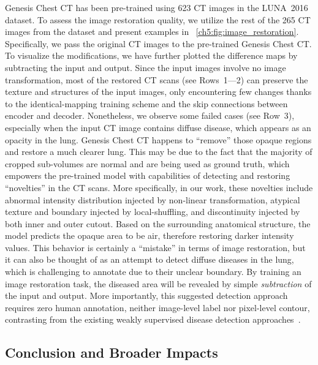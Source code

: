 Genesis Chest CT has been pre-trained using 623 CT images in the LUNA~2016 dataset. To assess the image restoration quality, we utilize the rest of the 265 CT images from the dataset and present examples in \figurename~\ref{ch5:fig:image_restoration}. Specifically, we pass the original CT images to the pre-trained Genesis Chest CT. To visualize the modifications, we have further plotted the difference maps by subtracting the input and output. Since the input images involve no image transformation, most of the restored CT scans (see Rows~1---2) can preserve the texture and structures of the input images, only encountering few changes thanks to the identical-mapping training scheme and the skip connections between encoder and decoder. Nonetheless, we observe some failed cases (see Row~3), especially when the input CT image contains diffuse disease, which appears as an opacity in the lung.
Genesis Chest CT happens to ``remove'' those opaque regions and restore a much clearer lung. This may be due to the fact that the majority of cropped sub-volumes are normal and are being used as ground truth, which empowers the pre-trained model with capabilities of detecting and restoring ``novelties'' in the CT scans. More specifically, in our work, these novelties include abnormal intensity distribution injected by non-linear transformation, atypical texture and boundary injected by local-shuffling, and discontinuity injected by both inner and outer cutout. Based on the surrounding anatomical structure, the model predicts the opaque area to be air, therefore restoring darker intensity values. This behavior is certainly a ``mistake'' in terms of image restoration, but it can also be thought of as an attempt to detect diffuse diseases in the lung, which is challenging to annotate due to their unclear boundary. By training an image restoration task, the diseased area will be revealed by simple \textit{subtraction} of the input and output. More importantly, this suggested detection approach requires zero human annotation, neither image-level label nor pixel-level contour, contrasting from the existing weakly supervised disease detection approaches~\citep{zhou2016learning,baumgartner2018visual,cai2018iterative,siddiquee2019learning}.


\subsection{Conclusion and Broader Impacts}
\label{ch5:discussion_conclusion:conclusion_broader_impacts}

